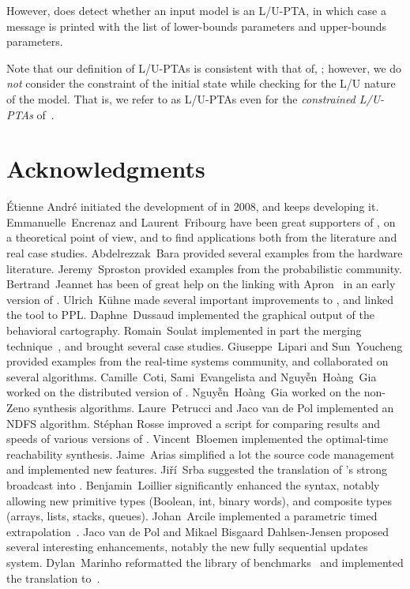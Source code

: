 However, \imitator{} does detect whether an input model is an L/U-PTA, in which case a message is printed with the list of lower-bounds parameters and upper-bounds parameters.

\begin{remark}
	Note that our definition of L/U-PTAs is consistent with that of, \eg{} \cite{BlT09}; however, we do \emph{not} consider the constraint of the initial state while checking for the L/U nature of the model.
	That is, we refer to as L/U-PTAs even for the \emph{constrained L/U-PTAs} of~\cite{BlT09}.
\end{remark}




\chapter{Acknowledgments}

\sloppy
\'Etienne André initiated the development of \imitator{} in 2008, and keeps developing it.
Emmanuelle~Encrenaz and Laurent~Fribourg have been great supporters of \imitator{}, on a theoretical point of view, and to find applications both from the literature and real case studies.
Abdelrezzak~Bara provided several examples from the hardware literature.
Jeremy~Sproston provided examples from the probabilistic community.
Bertrand~Jeannet has been of great help on the linking with Apron~\cite{JM09} in an early version of \imitator{}.
Ulrich~K\"uhne made several important improvements to \imitator{}, and linked the tool to PPL.
Daphne~Dussaud implemented the graphical output of the behavioral cartography.
Romain~Soulat implemented in part the merging technique~\cite{AFS13atva}, and brought several case studies.
Giuseppe~Lipari and Sun~Youcheng provided examples from the real-time systems community, and collaborated on several algorithms.
Camille~Coti, Sami~Evangelista and Nguy\~{ê}n~Hoàng~Gia worked on the distributed version of \imitator{}.
Nguy\~{ê}n~Hoàng~Gia worked on the non-Zeno synthesis algorithms.
Laure~Petrucci and Jaco van de Pol implemented an NDFS algorithm.
%
Stéphan Rosse improved a script for comparing results and speeds of various versions of \imitator{}.
%
Vincent~Bloemen implemented the optimal-time reachability synthesis.
%
Jaime~Arias simplified a lot the source code management and implemented new features.
%
Jiří~Srba suggested the translation of \imitator{}'s strong broadcast into \uppaal{}.
%
Benjamin~Loillier significantly enhanced the syntax, notably allowing new primitive types (Boolean, int, binary words), and composite types (arrays, lists, stacks, queues).
%
Johan~Arcile implemented a parametric timed extrapolation~\cite{AA22}.
%
Jaco van de Pol and Mikael Bisgaard Dahlsen-Jensen proposed several interesting enhancements, notably the new fully sequential updates system.
%
Dylan~Marinho reformatted the library of benchmarks~\cite{AMP21} and implemented the translation to~\jani{}.

